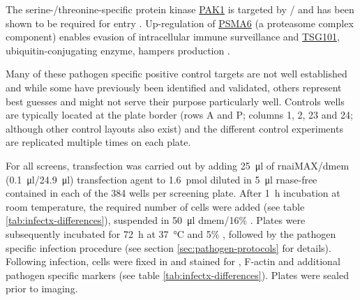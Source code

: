 \begin{description}[leftmargin=0.5cm]
\item[Vaccinia virus:] The serine-\slash threonine-specific protein kinase \hyperlink{tab:control-pak1}{PAK1} is targeted by \slash {} and has been shown to be required for  entry \citep{Mercer2008}. Up-regulation of \hyperlink{tab:control-psma6}{PSMA6} (a proteasome complex component) enables evasion of intracellular immune surveillance \citep{Zhou2014} and \hyperlink{tab:control-tsg101}{TSG101}, ubiquitin-conjugating enzyme, hampers  production \citep{Honeychurch2007}. 
\end{description}

Many of these pathogen specific positive control targets are not well established and while some have previously been identified and validated, others represent best guesses and might not serve their purpose particularly well. Controls wells are typically located at the plate border (rows A and P; columns 1, 2, 23 and 24; although other control layouts also exist) and the different control experiments are replicated multiple times on each plate.

For all screens,  transfection was carried out by adding \SI{25}{\micro\litre} of \acrshort{rnai}\-MAX\slash \acrshort{dmem} (\SI{0.1}{\micro\litre}\slash \SI{24.9}{\micro\litre}) transfection agent to \SI{1.6}{\pico\mol}  diluted in \SI{5}{\micro\litre} \acrshort{rnase}-free  contained in each of the 384 wells per screening plate. After \SI{1}{\hour} incubation at room temperature, the required number of cells were added (see table \ref{tab:infectx-differences}), suspended in \SI{50}{\micro\litre} \acrshort{dmem}\slash 16\% . Plates were subsequently incubated for \SI{72}{\hour} at \SI{37}{\celsius} and 5\% , followed by the pathogen specific infection procedure (see section \ref{sec:pathogen-protocols} for details). Following infection, cells were fixed in  and stained for , F-actin and additional pathogen specific markers (see table \ref{tab:infectx-differences}). Plates were sealed prior to imaging.

